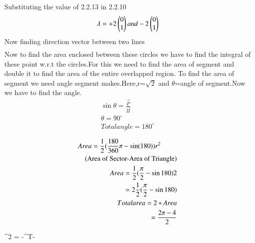 \documentclass[journal,12pt,twocolumn]{IEEEtran}
\begin{document}
 Substituting the value of 2.2.13 in 2.2.10
 \begin{align}
 \mathbf{\lambda} = +2\begin{pmatrix}0\\1\end{pmatrix} and - 2\begin{pmatrix}0\\1\end{pmatrix}
 \end{align}
 Now finding direction vector between two lines\\
 \begin{align}
 \end{align}
 Now to find the area enclosed between these circles we have to find the integral of these point w.r.t the circles.For this we need to find the area of segment and double it to find the area of the entire overlapped region. To find the area of segment we need angle segment makes.Here,r=$\sqrt{2}$ and $\theta$=angle of segment.Now we have to find the angle.\\ 
\begin{align*}
\sin \theta=\frac{\vec{P}}{\vec{H}}\\ 
\theta=90^{\circ}\\
Total angle=180^{\circ}\\
\end{align*}
 \begin{align}
 \begin{multlined}
 Area=\frac{1}{2}(\frac{180}{360}\pi-\sin (180))r^{2}\\
 $(Area of Sector-Area of Triangle)$
\end{multlined}\\
Area={\frac{1}{2}}(\frac{\pi}{2}-\sin 180)2\\
=2{\frac{1}{2}}(\frac{\pi}{2}-\sin 180)\\
Total area=2*Area\\
=\frac{2\pi-4}{2}
\end{align}

^2 = {-}^T{-}
  
\end{document}
